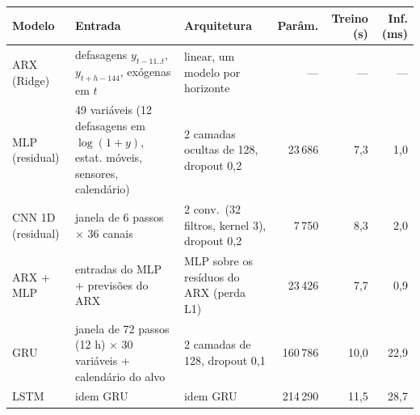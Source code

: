 \begin{tabular}{@{}lp{4.6cm}p{3.6cm}rrr@{}}
\toprule
Modelo & Entrada & Arquitetura & Parâm. & Treino (s) & Inf. (ms) \\
\midrule
ARX (Ridge) & defasagens $y_{t-11..t}$, $y_{t+h-144}$, exógenas em $t$ & linear, um modelo por horizonte & --- & --- & --- \\
MLP (residual) & 49 variáveis (12 defasagens em $\log(1+y)$, estat. móveis, sensores, calendário) & 2 camadas ocultas de 128, dropout 0,2 & 23\,686 & 7,3 & 1,0 \\
CNN 1D (residual) & janela de 6 passos $\times$ 36 canais & 2 conv.\ (32 filtros, kernel 3), dropout 0,2 & 7\,750 & 8,3 & 2,0 \\
ARX + MLP & entradas do MLP + previsões do ARX & MLP sobre os resíduos do ARX (perda L1) & 23\,426 & 7,7 & 0,9 \\
GRU & janela de 72 passos (12 h) $\times$ 30 variáveis + calendário do alvo & 2 camadas de 128, dropout 0,1 & 160\,786 & 10,0 & 22,9 \\
LSTM & idem GRU & idem GRU & 214\,290 & 11,5 & 28,7 \\
\bottomrule
\end{tabular}
